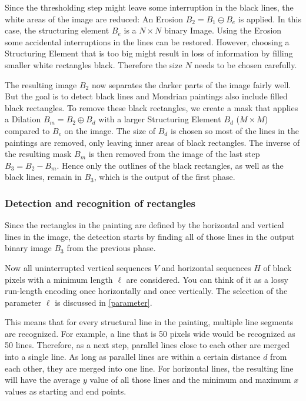 \documentclass[serif,article,noparskip]{agse-thesis}
\begin{document}
Since the thresholding step might leave some interruption in the black lines,
the white areas of the image are reduced: An Erosion $B_2 = B_1 \ominus B_e$ is
applied. In this case, the structuring element $B_e$ is a $N\times N$ binary
Image. Using the Erosion some accidental interruptions in the lines can be
restored. However, choosing a Structuring Element that is too big might result
in loss of information by filling smaller white rectangles black. Therefore the
size $N$ needs to be chosen carefully.

The resulting image $B_2$ now separates the darker parts of the image fairly
well. But the goal is to detect black lines and Mondrian paintings also include
filled black rectangles. To remove these black rectangles, we create a mask that
applies a Dilation $B_m = B_2 \oplus B_d$ with a larger Structuring Element
$B_d$ ($M\times M$) compared to $B_e$ on the image. The size of $B_d$ is chosen
so most of the lines in the paintings are removed, only leaving inner areas of
black rectangles. The inverse of the resulting mask $B_m$ is then removed from
the image of the last step $B_3 = B_2 - B_m$. Hence only the outlines of the
black rectangles, as well as the black lines, remain in $B_3$, which is the
output of the first phase.

\subsubsection{Detection and recognition of rectangles} \label{rectangles}

Since the rectangles in the painting are defined by the horizontal and
vertical lines in the image, the detection starts by finding all of those lines
in the output binary image $B_3$ from the previous phase.

Now all uninterrupted vertical sequences $V$ and horizontal sequences $H$ of
black pixels with a minimum length $\ell$ are considered. You can think of it as
a lossy run-length encoding once horizontally and once vertically. The selection
of the parameter $\ell$ is discussed in \ref{parameter}.

This means that for every structural line in the painting, multiple line
segments are recognized. For example, a line that is 50 pixels wide would be
recognized as 50 lines. Therefore, as a next step, parallel lines close to each
other are merged into a single line. As long as parallel lines are within a
certain distance $d$ from each other, they are merged into one line. For
horizontal lines, the resulting line will have the average $y$ value of all
those lines and the minimum and maximum $x$ values as starting and end points.
\end{document}
